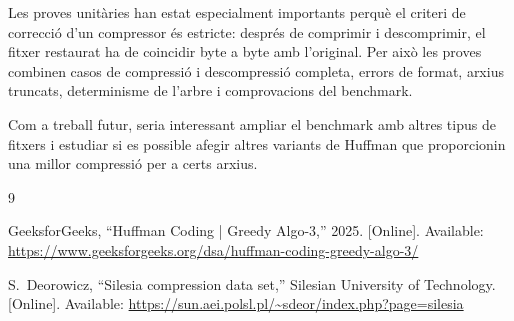 \documentclass[conference,compsoc]{IEEEtran}
\begin{document}
Les proves unitàries han estat especialment importants perquè el criteri de
correcció d'un compressor és estricte: després de comprimir i descomprimir,
el fitxer restaurat ha de coincidir byte a byte amb l'original. Per això les
proves combinen casos de compressió i descompressió completa, errors de format, arxius truncats,
determinisme de l'arbre i comprovacions del benchmark.

Com a treball futur, seria interessant ampliar el benchmark amb altres
tipus de fitxers i estudiar si es possible afegir altres variants de Huffman que
proporcionin una millor compressió per a certs arxius.

\begin{thebibliography}{9}

GeeksforGeeks, ``Huffman Coding | Greedy Algo-3,'' 2025. [Online]. Available:
\url{https://www.geeksforgeeks.org/dsa/huffman-coding-greedy-algo-3/}

S.~Deorowicz, ``Silesia compression data set,'' Silesian University of
Technology. [Online]. Available:
\url{https://sun.aei.polsl.pl/~sdeor/index.php?page=silesia}

\end{thebibliography}
\end{document}
